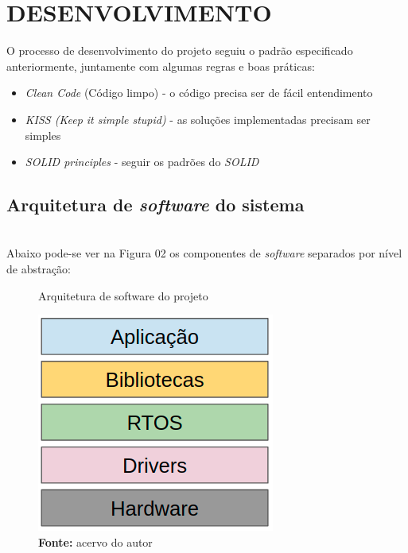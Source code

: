 \documentclass[times, twoside, watermark]{artigo}
\begin{document}

\section{DESENVOLVIMENTO}

O processo de desenvolvimento do projeto seguiu o padrão especificado anteriormente,
juntamente com algumas regras e boas práticas:

\begin{itemize}
\item \textit{Clean Code} (Código limpo) - o código precisa ser de fácil 
entendimento\cite{martin2009clean}
\item \textit{KISS (Keep it simple stupid)} - as soluções implementadas precisam ser 
simples\cite{martin2018clean}
\item \textit{SOLID principles} - seguir os padrões do \textit{SOLID}
\cite{martin2002agile}
\end{itemize}

\subsection{Arquitetura de \textit{software} do sistema}\hfill\\
Abaixo pode-se ver na Figura 02 os componentes de \textit{software} separados por nível de abstração:\hfill\\

\begin{figure}[H]
    \centering
    \caption{Arquitetura de software do projeto}
    \includegraphics[width=0.7\linewidth]{images/arch.png}
    \caption*{\newline\textbf{Fonte:} acervo do autor}
\end{figure}
\end{document}
